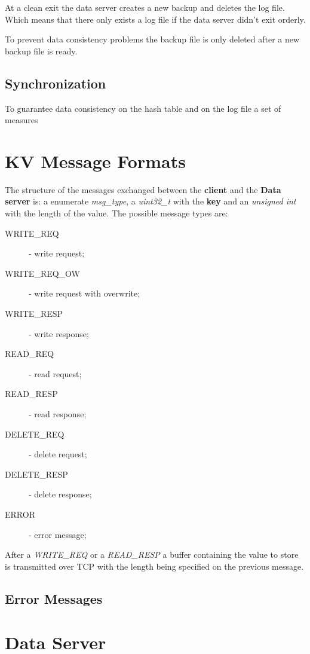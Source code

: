 \documentclass[12pt]{article} %
\begin{document}
At a clean exit the data server creates a new backup and deletes the log file. Which means that there only exists a log file if the data server didn't exit orderly.

To prevent data consistency problems the backup file is only deleted after a new backup file is ready.



\subsection{Synchronization}
\label{sub:Synchronization}

To guarantee data consistency on the hash table and on the log file a set of measures


\section{KV Message Formats}

The structure of the messages exchanged between the \textbf{client} and the \textbf{Data server} is:  a  enumerate \emph{msg\_type}, a \emph{uint32\_t} with the \textbf{key} and an \emph{unsigned int} with the length of the value. The possible message types are:
\begin{description}
    \item[WRITE\_REQ] - write request;
    \item[WRITE\_REQ\_OW] - write request with overwrite;
    \item[WRITE\_RESP] - write response;
    \item[READ\_REQ] - read request;
    \item[READ\_RESP] - read response;
    \item[DELETE\_REQ] - delete request;
    \item[DELETE\_RESP] - delete response;
    \item[ERROR] - error message;
\end{description}
After a \emph{WRITE\_REQ} or a \emph{READ\_RESP} a buffer containing the value to store is transmitted over TCP with the length being specified on the previous message.


\subsection{Error Messages}
\label{sub:ErrorMessages}


\section{Data Server}
\label{sec:DataServer}
\end{document}
